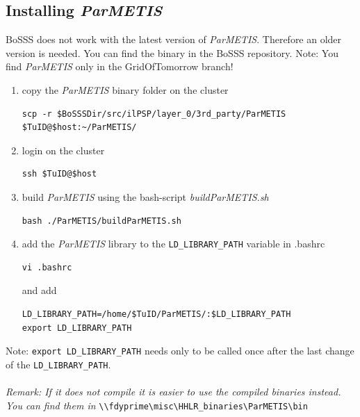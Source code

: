 \documentclass[11pt,twoside,a4paper]{fdyartcl}
\begin{document}
\subsection{Installing \emph{ParMETIS}}
BoSSS does not work with the latest version of \emph{ParMETIS}. Therefore an older version is needed. You can find the binary in the BoSSS repository. Note: You find \emph{ParMETIS} only in the GridOfTomorrow branch!
\begin{enumerate}
\item copy the \emph{ParMETIS} binary folder on the cluster
\begin{verbatim}
scp -r $BoSSSDir/src/ilPSP/layer_0/3rd_party/ParMETIS $TuID@$host:~/ParMETIS/
\end{verbatim}
\item login on the cluster
\begin{verbatim}
ssh $TuID@$host
\end{verbatim}
\item build \emph{ParMETIS} using the bash-script \emph{buildParMETIS.sh}
\begin{verbatim}
bash ./ParMETIS/buildParMETIS.sh
\end{verbatim}
\item  add the \emph{ParMETIS} library to the \verb|LD_LIBRARY_PATH| variable in .bashrc
\begin{verbatim}
vi .bashrc
\end{verbatim}
and add
\begin{verbatim}
LD_LIBRARY_PATH=/home/$TuID/ParMETIS/:$LD_LIBRARY_PATH
export LD_LIBRARY_PATH
\end{verbatim}
\end{enumerate}
Note: \verb|export LD_LIBRARY_PATH| needs only to be called once after the last change of the \verb|LD_LIBRARY_PATH|.\\\\
\textit{Remark: If it does not compile it is easier to use the compiled binaries instead. You can find them in} \verb|\\fdyprime\misc\HHLR_binaries\ParMETIS\bin|
\end{document}
